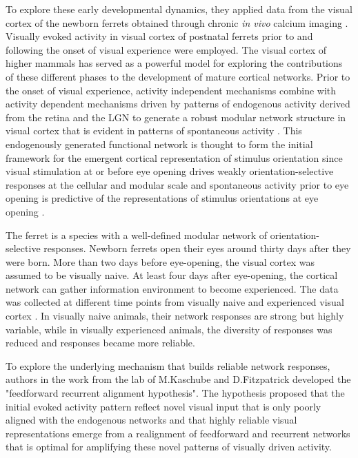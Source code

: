 \documentclass[11pt]{article}
\begin{document}
	
	To explore these early developmental dynamics, they applied data from the visual cortex of the newborn ferrets obtained through chronic \textit{in vivo} calcium imaging \cite{tragenap2023nature}. Visually evoked activity in visual cortex of postnatal ferrets prior to and following the onset of visual experience were employed. The visual cortex of higher mammals has served as a powerful model for exploring the contributions of these different phases to the development of mature cortical networks. Prior to the onset of visual experience, activity independent mechanisms combine with activity dependent mechanisms driven by patterns of endogenous activity derived from the retina and the LGN \cite{feller1996requirement, meister1991synchronous, penn1998competition} to generate a robust modular network structure in visual cortex that is evident in patterns of spontaneous activity \cite{chiu2001spontaneous, smith2018distributed}. This endogenously generated functional network is thought to form the initial framework for the emergent cortical representation of stimulus orientation since visual stimulation at or before eye opening drives weakly orientation-selective responses at the cellular and modular scale \cite{chang2020experience, chapman1996development, crair1998role, godecke1997development, schmidt1999matching} and spontaneous activity prior to eye opening is predictive of the representations of stimulus orientations at eye opening \cite{smith2018distributed}. %
	
	The ferret is a species with a well-defined modular network of orientation-selective responses. Newborn ferrets open their eyes around thirty days after they were born. More than two days before eye-opening, the visual cortex was assumed to be visually naive. At least four days after eye-opening, the cortical network can gather information environment to become experienced. The data was collected at different time points from visually naive and experienced visual cortex \cite[Figure 1a]{tragenap2023nature}. In visually naive animals, their network responses are strong but highly variable, while in visually experienced animals, the diversity of responses was reduced and responses became more reliable. 
	
	To explore the underlying mechanism that builds reliable network responses, authors in the work from the lab of M.Kaschube and D.Fitzpatrick \cite{tragenap2023nature} developed the "feedforward recurrent alignment hypothesis". The hypothesis proposed that the initial evoked activity pattern reflect novel visual input that is only poorly aligned with the endogenous networks and that highly reliable visual representations emerge from a realignment of feedforward and recurrent networks that is optimal for amplifying these novel patterns of visually driven activity. 
	
\end{document}
